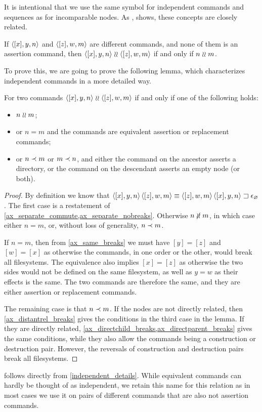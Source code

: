 It is intentional that we use the same symbol for independent commands
and sequences as for incomparable nodes. As
,
shows, these concepts are closely related.

\begin{mycor}
If $\langle{[x],y,n}\rangle$ and $\langle{[z],w,m}\rangle$ are different commands,
and none of them is an assertion command, then
$\langle{[x],y,n}\rangle\mathrel{\wr\wr}\langle{[z],w,m}\rangle$ if and only if $n\mathrel{\wr\wr} m$.
\end{mycor}

To prove this, we are going to prove the following lemma,
which characterizes independent commands in a more detailed way.

\begin{mylem}
For two commands $\langle{[x],y,n}\rangle\mathrel{\wr\wr}\langle{[z],w,m}\rangle$ if and only if
one of the following holds:
\begin{itemize}
\item $n\mathrel{\wr\wr} m$;
\item or $n=m$ and the commands are equivalent assertion or replacement commands;
\item or $n\prec m$ or $m\prec n$,
and either the command on the ancestor asserts a directory,
or the command on the descendant asserts an empty node (or both).
\end{itemize}
\end{mylem}

\begin{proof}
By definition we know that $\langle{[x],y,n}\rangle\,\langle{[z],w,m}\rangle\equiv{\langle{[z],w,m}\rangle\,\langle{[x],y,n}\rangle}\sqsupset\epsilon_\varnothing$.
The first case is a restatement of
\cref{ax_separate_commute,ax_separate_nobreaks}.
Otherwise $n\nunrel m$, in which case either $n=m$, or, without loss of generality, $n\prec m$.

If $n=m$, then from \cref{ax_same_breaks} we must have $[y]=[z]$ and $[w]=[x]$
as otherwise the commands, in one order or the other, would break all filesystems.
The equivalence also implies $[x]=[z]$ as otherwise the two sides would not be defined on the same filesystem,
as well as $y=w$ as their effects is the same.
The two commands are therefore the same, and they are either assertion or replacement commands.

The remaining case is that $n\prec m$.
If the nodes are not directly related, then \cref{ax_distantrel_breaks} gives
the conditions in the third case in the lemma.
If they are directly related, 
\cref{ax_directchild_breaks,ax_directparent_breaks}
gives the same conditions, while they also allow the commands being
a construction or destruction pair.
However, the reversals of construction and destruction pairs break all filesystems.
\end{proof}

 follows directly from \cref{independent_details}.
While equivalent commands can hardly be thought of as independent,
we retain this name for this relation as in most
cases we use it on pairs of different commands that are also not assertion commands.
